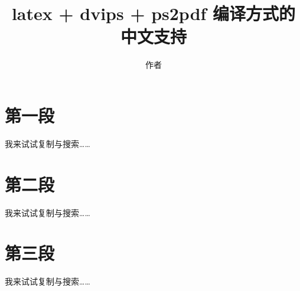 ﻿\documentclass{article}
\begin{document}
\begin{CJK*}{UTF8}{gbsn}                          %

\title{latex + dvips + ps2pdf 编译方式的中文支持}
\author{作者}
\maketitle
\tableofcontents

\section{第一段}
  我来试试复制与搜索……
\section{第二段}
  我来试试复制与搜索……
\section{第三段}
  我来试试复制与搜索……
 
\end{CJK*}
\end{document}
